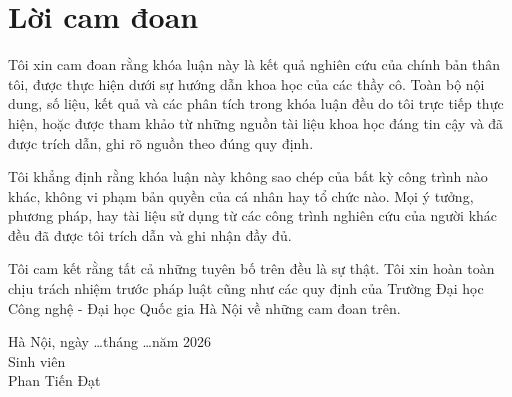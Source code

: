 \chapter*{Lời cam đoan}

Tôi xin cam đoan rằng khóa luận này là kết quả nghiên cứu của chính bản thân tôi, được thực hiện dưới sự hướng dẫn khoa học của các thầy cô. Toàn bộ nội dung, số liệu, kết quả và các phân tích trong khóa luận đều do tôi trực tiếp thực hiện, hoặc được tham khảo từ những nguồn tài liệu khoa học đáng tin cậy và đã được trích dẫn, ghi rõ nguồn theo đúng quy định.  

Tôi khẳng định rằng khóa luận này không sao chép của bất kỳ công trình nào khác, không vi phạm bản quyền của cá nhân hay tổ chức nào. Mọi ý tưởng, phương pháp, hay tài liệu sử dụng từ các công trình nghiên cứu của người khác đều đã được tôi trích dẫn và ghi nhận đầy đủ.  

Tôi cam kết rằng tất cả những tuyên bố trên đều là sự thật. Tôi xin hoàn toàn chịu trách nhiệm trước pháp luật cũng như các quy định của Trường Đại học Công nghệ - Đại học Quốc gia Hà Nội về những cam đoan trên.
\\

\begin{flushright}
	\begin{varwidth}{\linewidth}\centering
		Hà Nội, ngày \ldots\space tháng \ldots\space năm 2026\\
		\bigbreak
		Sinh viên\\[1.5cm]
		Phan Tiến Đạt
	\end{varwidth}
\end{flushright}
